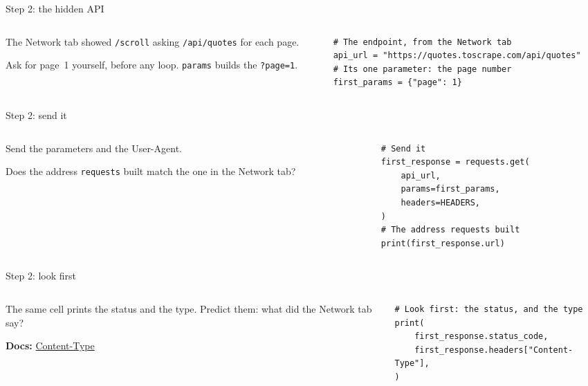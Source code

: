 \documentclass[9pt,aspectratio=169]{beamer}
\begin{document}
\begin{frame}[fragile]{Step 2: the hidden API}
    \begin{columns}[T]
        \begin{column}{0.37\textwidth}
            The Network tab showed \texttt{/scroll} asking \texttt{/api/quotes} for each page.

            \medskip
            Ask for page~1 yourself, before any loop. \texttt{params} builds the \texttt{?page=1}.
        \end{column}
        \begin{column}{0.6\textwidth}
\begin{lstlisting}[style=lab]
# The endpoint, from the Network tab
api_url = "https://quotes.toscrape.com/api/quotes"
# Its one parameter: the page number
first_params = {"page": 1}
\end{lstlisting}
        \end{column}
    \end{columns}
\end{frame}

\begin{frame}[fragile]{Step 2: send it}
    \begin{columns}[T]
        \begin{column}{0.37\textwidth}
            Send the parameters and the User-Agent.

            \medskip
            Does the address \texttt{requests} built match the one in the Network tab?
        \end{column}
        \begin{column}{0.6\textwidth}
\begin{lstlisting}[style=lab]
# Send it
first_response = requests.get(
    api_url,
    params=first_params,
    headers=HEADERS,
)
# The address requests built
print(first_response.url)
\end{lstlisting}
        \end{column}
    \end{columns}
\end{frame}

\begin{frame}[fragile]{Step 2: look first}
    \begin{columns}[T]
        \begin{column}{0.37\textwidth}
            The same cell prints the status and the type. Predict them: what did the Network tab say?

            \medskip
            {\scriptsize\textbf{Docs:} \href{https://developer.mozilla.org/en-US/docs/Web/HTTP/Reference/Headers/Content-Type}{Content-Type}\par}
        \end{column}
        \begin{column}{0.6\textwidth}
\begin{lstlisting}[style=lab]
# Look first: the status, and the type
print(
    first_response.status_code,
    first_response.headers["Content-Type"],
)
\end{lstlisting}
        \end{column}
    \end{columns}
\end{frame}
\end{document}
